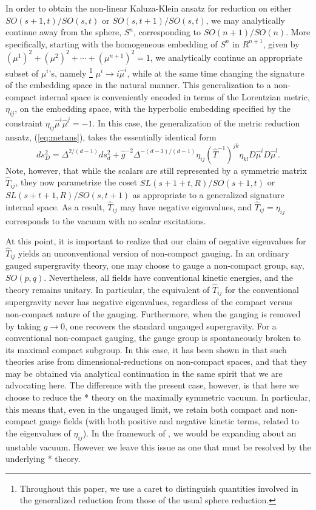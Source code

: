 \documentclass[a4paper,12pt]{article}
\begin{document}
In order to obtain the non-linear Kaluza-Klein ansatz for reduction on
either $SO(s+1,t)/SO(s,t)$ or $SO(s,t+1)/SO(s,t)$, we may analytically
continue away from the sphere, $S^n$, corresponding to $SO(n+1)/SO(n)$.
More specifically, starting with the homogeneous embedding of $S^n$ in
$R^{n+1}$, given by $(\mu^1)^2+(\mu^2)^2+\cdots+(\mu^{n+1})^2=1$, we
analytically continue an appropriate subset of $\mu^i$'s, namely%
%
\footnote{Throughout this paper, we use a caret to distinguish quantities
involved in the generalized reduction from those of the usual sphere
reduction.}
%
$\mu^i\to i\hat\mu^i$, while at the same time changing the signature of
the embedding space in the natural manner.  This generalization to a
non-compact internal space is conveniently encoded in terms of the
Lorentzian metric, $\eta_{ij}$, on the embedding space, with the
hyperbolic embedding specified by the constraint
$\eta_{ij}\hat\mu^i\hat\mu^j=-1$.  In this case, the generalization of
the metric reduction ansatz, (\ref{eq:metans}), takes the essentially
identical form
%
\begin{equation}
ds_D^2=\Delta^{2/(d-1)}ds_d^2+\hat g^{-2}\Delta^{-(d-3)/(d-1)}
\eta_{ij}(\hat T^{-1})^{jk}\eta_{kl} D\hat\mu^iD\hat\mu^l.
\label{eq:hatmetans}
\end{equation}
%
Note, however, that while the scalars are still represented by a
symmetric matrix $\hat T_{ij}$, they now parametrize the coset
$SL(s+1+t,R)/SO(s+1,t)$ or $SL(s+t+1,R)/SO(s,t+1)$ as appropriate to a
generalized signature internal space.  As a result, $\hat T_{ij}$ may
have negative eigenvalues, and $\hat T_{ij}=\eta_{ij}$ corresponds to
the vacuum with no scalar excitations.  

At this point, it is important to realize that our claim of negative
eigenvalues for $\hat T_{ij}$ yields an unconventional version of non-compact
gauging.  In an ordinary gauged supergravity theory, one may choose to
gauge a non-compact group, say, $SO(p,q)$.  Nevertheless, all fields
have conventional kinetic energies, and the theory remains unitary.  In
particular, the equivalent of $\hat T_{ij}$ for the conventional
supergravity never has negative eigenvalues, regardless of the compact
versus non-compact nature of the gauging.  Furthermore, when the gauging
is removed by taking $g\to0$, one recovers the standard ungauged
supergravity.  For a conventional non-compact gauging, the gauge group is
spontaneously broken to its maximal compact subgroup.  In this case, it
has been shown in \cite{HullWarner,Gibbons} that such theories arise from
dimensional-reductions on non-compact spaces, and that they may be
obtained via analytical continuation in the same spirit that we are
advocating here.  The difference with the present case, however, is that
here we choose to reduce the * theory on the maximally symmetric vacuum.
In particular, this means that, even in the ungauged limit, we retain
both compact and non-compact gauge fields (with both positive and negative
kinetic terms, related to the eigenvalues of $\eta_{ij}$).  In the
framework of \cite{HullWarner}, we would be expanding about an unstable
vacuum.  However we leave this issue as one that must be resolved by the
underlying * theory.
\end{document}
